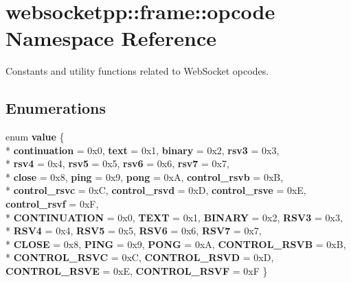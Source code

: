 \hypertarget{namespacewebsocketpp_1_1frame_1_1opcode}{}\section{websocketpp\+:\+:frame\+:\+:opcode Namespace Reference}
\label{namespacewebsocketpp_1_1frame_1_1opcode}


Constants and utility functions related to Web\+Socket opcodes.  


\subsection*{Enumerations}
\begin{DoxyCompactItemize}
\item 
enum {\bfseries value} \{ \\*
{\bfseries continuation} = 0x0, 
{\bfseries text} = 0x1, 
{\bfseries binary} = 0x2, 
{\bfseries rsv3} = 0x3, 
\\*
{\bfseries rsv4} = 0x4, 
{\bfseries rsv5} = 0x5, 
{\bfseries rsv6} = 0x6, 
{\bfseries rsv7} = 0x7, 
\\*
{\bfseries close} = 0x8, 
{\bfseries ping} = 0x9, 
{\bfseries pong} = 0xA, 
{\bfseries control\+\_\+rsvb} = 0xB, 
\\*
{\bfseries control\+\_\+rsvc} = 0xC, 
{\bfseries control\+\_\+rsvd} = 0xD, 
{\bfseries control\+\_\+rsve} = 0xE, 
{\bfseries control\+\_\+rsvf} = 0xF, 
\\*
{\bfseries C\+O\+N\+T\+I\+N\+U\+A\+T\+I\+ON} = 0x0, 
{\bfseries T\+E\+XT} = 0x1, 
{\bfseries B\+I\+N\+A\+RY} = 0x2, 
{\bfseries R\+S\+V3} = 0x3, 
\\*
{\bfseries R\+S\+V4} = 0x4, 
{\bfseries R\+S\+V5} = 0x5, 
{\bfseries R\+S\+V6} = 0x6, 
{\bfseries R\+S\+V7} = 0x7, 
\\*
{\bfseries C\+L\+O\+SE} = 0x8, 
{\bfseries P\+I\+NG} = 0x9, 
{\bfseries P\+O\+NG} = 0xA, 
{\bfseries C\+O\+N\+T\+R\+O\+L\+\_\+\+R\+S\+VB} = 0xB, 
\\*
{\bfseries C\+O\+N\+T\+R\+O\+L\+\_\+\+R\+S\+VC} = 0xC, 
{\bfseries C\+O\+N\+T\+R\+O\+L\+\_\+\+R\+S\+VD} = 0xD, 
{\bfseries C\+O\+N\+T\+R\+O\+L\+\_\+\+R\+S\+VE} = 0xE, 
{\bfseries C\+O\+N\+T\+R\+O\+L\+\_\+\+R\+S\+VF} = 0xF
 \}\hypertarget{namespacewebsocketpp_1_1frame_1_1opcode_ae68711643096dfc4af6d66ade3f9fd5e}{}\label{namespacewebsocketpp_1_1frame_1_1opcode_ae68711643096dfc4af6d66ade3f9fd5e}

\end{DoxyCompactItemize}
